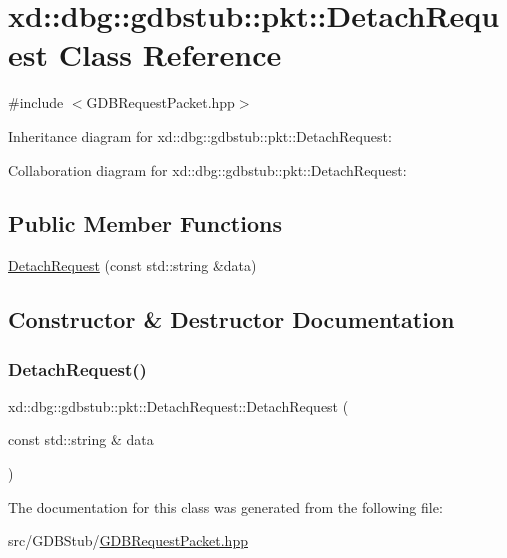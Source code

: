 \hypertarget{classxd_1_1dbg_1_1gdbstub_1_1pkt_1_1_detach_request}{}\section{xd\+:\+:dbg\+:\+:gdbstub\+:\+:pkt\+:\+:Detach\+Request Class Reference}
\label{classxd_1_1dbg_1_1gdbstub_1_1pkt_1_1_detach_request}


{\ttfamily \#include $<$G\+D\+B\+Request\+Packet.\+hpp$>$}



Inheritance diagram for xd\+:\+:dbg\+:\+:gdbstub\+:\+:pkt\+:\+:Detach\+Request\+:


Collaboration diagram for xd\+:\+:dbg\+:\+:gdbstub\+:\+:pkt\+:\+:Detach\+Request\+:
\subsection*{Public Member Functions}
\begin{DoxyCompactItemize}
\item 
\mbox{\hyperlink{classxd_1_1dbg_1_1gdbstub_1_1pkt_1_1_detach_request_a109c2d360a3c0fc09599b03e7743b033}{Detach\+Request}} (const std\+::string \&data)
\end{DoxyCompactItemize}


\subsection{Constructor \& Destructor Documentation}
\mbox{\label{classxd_1_1dbg_1_1gdbstub_1_1pkt_1_1_detach_request_a109c2d360a3c0fc09599b03e7743b033}} 
\subsubsection{\texorpdfstring{Detach\+Request()}{DetachRequest()}}
{\footnotesize\ttfamily xd\+::dbg\+::gdbstub\+::pkt\+::\+Detach\+Request\+::\+Detach\+Request (\begin{DoxyParamCaption}\item[{const std\+::string \&}]{data }\end{DoxyParamCaption})\hspace{0.3cm}{\ttfamily [inline]}}



The documentation for this class was generated from the following file\+:\begin{DoxyCompactItemize}
\item 
src/\+G\+D\+B\+Stub/\mbox{\hyperlink{_g_d_b_request_packet_8hpp}{G\+D\+B\+Request\+Packet.\+hpp}}\end{DoxyCompactItemize}

